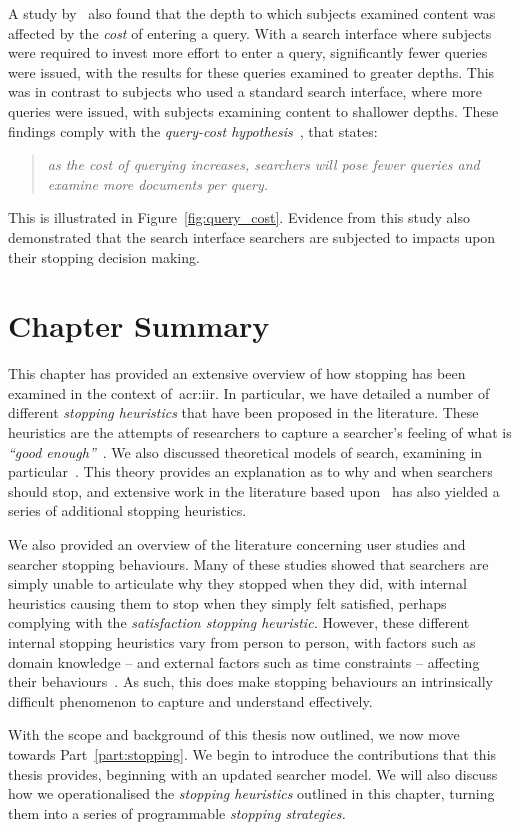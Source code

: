 A study by~\cite{azzopardi2013query_cost} also found that the depth to which subjects examined content was affected by the \emph{cost} of entering a query. With a search interface where subjects were required to invest more effort to enter a query, significantly fewer queries were issued, with the results for these queries examined to greater depths. This was in contrast to subjects who used a standard search interface, where more queries were issued, with subjects examining content to shallower depths. These findings comply with the \emph{query-cost hypothesis}~\citep{azzopardi2011economics}, that states:

\begin{quote}
    \emph{as the cost of querying increases, searchers will pose fewer queries and examine more documents per query.}
\end{quote}

This is illustrated in Figure~\ref{fig:query_cost}. Evidence from this study also demonstrated that the search interface searchers are subjected to impacts upon their stopping decision making.

\section{Chapter Summary}
This chapter has provided an extensive overview of how stopping has been examined in the context of~\gls{acr:iir}. In particular, we have detailed a number of different \emph{stopping heuristics} that have been proposed in the literature. These heuristics are the attempts of researchers to capture a searcher's feeling of what is \emph{``good enough''}~\citep{zach2005enough_is_enough}. We also discussed theoretical models of search, examining in particular~. This theory provides an explanation as to why and when searchers should stop, and extensive work in the literature based upon~ has also yielded a series of additional stopping heuristics.

We also provided an overview of the literature concerning user studies and searcher stopping behaviours. Many of these studies showed that searchers are simply unable to articulate why they stopped when they did, with internal heuristics causing them to stop when they simply felt satisfied, perhaps complying with the \emph{satisfaction stopping heuristic.} However, these different internal stopping heuristics vary from person to person, with factors such as domain knowledge -- and external factors such as time constraints -- affecting their behaviours~\citep{marchionini1995information_seeking}. As such, this does make stopping behaviours an intrinsically difficult phenomenon to capture and understand effectively.

With the scope and background of this thesis now outlined, we now move towards Part~\ref{part:stopping}. We begin to introduce the contributions that this thesis provides, beginning with an updated searcher model. We will also discuss how we operationalised the \emph{stopping heuristics} outlined in this chapter, turning them into a series of programmable \emph{stopping strategies.}